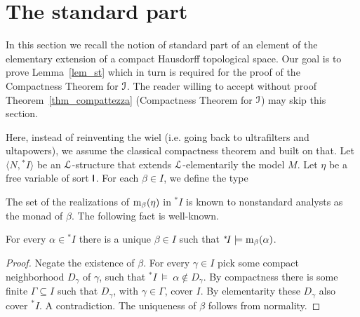 \documentclass[10pt,oneside]{amsproc}
\renewcommand*{\emph}[1]{%
   \smash{\tikz[baseline]\node[rectangle, fill=teal!25, rounded corners, inner xsep=0.5ex, inner ysep=0.2ex, anchor=base, minimum height = 2.7ex]{\strut #1};}}
\begin{document}
\section{The standard part}\label{standard_part}

In this section we recall the notion of standard part of an element of the elementary extension of a compact Hausdorff topological space.
Our goal is to prove Lemma~\ref{lem_st} which in turn is required for the proof of the Compactness Theorem for ${\EuScript I}$.
The reader willing to accept without proof Theorem~\ref{thm_compattezza} (Compactness Theorem for ${\EuScript I}$) may skip this section.

Here, instead of reinventing the wiel (i.e. going back to ultrafilters and ultapowers), we assume the classical compactness theorem and built on that.
Let $\langle N, {}^*\!I\rangle$ be an ${\EuScript L}$-structure that extends ${\EuScript L}$-elementarily the model $M$. %
Let $\eta$ be a free variable of sort ${\sf I}$.
For each $\beta\in I$, we define the type


The set of the realizations of ${\rm m}_\beta(\eta)$ in ${}^*\!I$ is known to nonstandard analysts as the monad of $\beta$. 
The following fact is well-known.

\begin{fact}\label{fact_uniqueness_st}
  For every $\alpha\in{}^*\!I$ there is a unique $\beta\in I$ such that ${}^*\!I\models{\rm m}_\beta(\alpha)$.
\end{fact}

\begin{proof}
  Negate the existence of $\beta$.
  For every $\gamma\in I$ pick some compact neighborhood $D_\gamma$ of $\gamma$, such that ${}^*\!I\ \models\ \alpha\notin D_\gamma$.
  By compactness there is some finite $\Gamma\subseteq I$ such that $D_\gamma$, with $\gamma\in\Gamma$, cover $I$.
  By elementarity these $D_{\gamma}$ also cover ${}^*\!I$.
  A contradiction.
  The uniqueness of $\beta$ follows from normality.
\end{proof}
\end{document}
